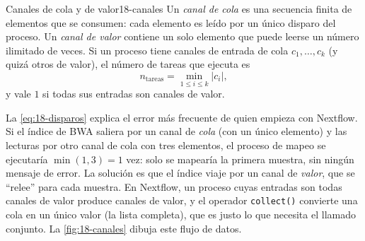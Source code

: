 \begin{definicion}{Canales de cola y de valor}{18-canales}
Un \emph{canal de cola} es una secuencia finita de elementos que se consumen: cada elemento es leído por un único disparo del proceso. Un \emph{canal de valor} contiene un solo elemento que puede leerse un número ilimitado de veces. Si un proceso tiene canales de entrada de cola $c_1,\dots,c_k$ (y quizá otros de valor), el número de tareas que ejecuta es
\begin{equation}\label{eq:18-disparos}
n_{\text{tareas}} = \min_{1\le i\le k} |c_i|,
\end{equation}
y vale $1$ si todas sus entradas son canales de valor.
\end{definicion}

\begin{simbolos}
\end{simbolos}

La \cref{eq:18-disparos} explica el error más frecuente de quien empieza con Nextflow. Si el índice de BWA saliera por un canal de \emph{cola} (con un único elemento) y las lecturas por otro canal de cola con tres elementos, el proceso de mapeo se ejecutaría $\min(1,3)=1$ vez: solo se mapearía la primera muestra, sin ningún mensaje de error. La solución es que el índice viaje por un canal de \emph{valor}, que se ``relee'' para cada muestra. En Nextflow, un proceso cuyas entradas son todas canales de valor produce canales de valor, y el operador \texttt{collect()} convierte una cola en un único valor (la lista completa), que es justo lo que necesita el llamado conjunto. La \cref{fig:18-canales} dibuja este flujo de datos.

